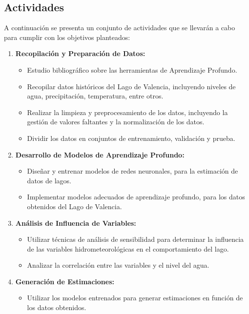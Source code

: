 \documentclass[12pt]{article}
\begin{document}
\subsection{Actividades}
A continuaci\'on se presenta un conjunto de actividades que se llevarán a cabo para cumplir con los objetivos planteados:
\begin{enumerate}
    \item \textbf{Recopilación y Preparación de Datos:}
    \begin{itemize}
        \item Estudio bibliogr\'afico sobre las herramientas de Aprendizaje Profundo.
        \item Recopilar datos históricos del Lago de Valencia, incluyendo niveles de agua, precipitación, temperatura, entre otros.
        \item Realizar la limpieza y preprocesamiento de los datos, incluyendo la gestión de valores faltantes y la normalización de los datos.
        \item Dividir los datos en conjuntos de entrenamiento, validación y prueba.
    \end{itemize}
    \item \textbf{Desarrollo de Modelos de Aprendizaje Profundo:}
    \begin{itemize}
        \item Diseñar y entrenar modelos de redes neuronales, para la estimación de datos de lagos.        
        \item Implementar modelos adecuados de aprendizaje profundo, para los datos obtenidos del Lago de Valencia.
    \end{itemize}
    \item \textbf{Análisis de Influencia de Variables:}
    \begin{itemize}
        \item Utilizar técnicas de análisis de sensibilidad para determinar la influencia de las variables hidrometeorológicas en el comportamiento del lago.
        \item Analizar la correlación entre las variables y el nivel del agua.
    \end{itemize}
    \item \textbf{Generación de Estimaciones:}
    \begin{itemize}
        \item Utilizar los modelos entrenados para generar estimaciones en funci\'on de los datos obtenidos.
    \end{itemize}
\end{enumerate}
\end{document}
